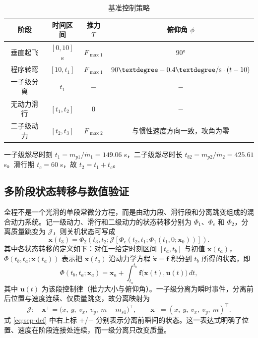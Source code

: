 \documentclass[withoutpreface,bwprint]{cumcmthesis}
\begin{document}
\begin{table}[!htbp]
\caption{基准控制策略}
\label{tab:q1ctrl}
\centering
\begin{tabular}{c|c|c|c}
\toprule[1.5pt]
阶段 & 时间区间 & 推力 $T$ & 俯仰角 $\phi$ \\
\midrule[1pt]
垂直起飞 & $[0,10]$ s & $F_{\max1}$ & $90°$ \\
程序转弯 & $[10,t_1]$ & $F_{\max1}$ & $90°-0.4°/{\rm s}\cdot(t-10)$ \\
一子级分离 & $t_1$ & $-$ & $-$ \\
无动力滑行 & $[t_1,t_2]$ & $0$ & $-$ \\
二子级动力 & $[t_2, t_3]$ & $F_{\max2}$ & 与惯性速度方向一致，攻角为零 \\
\bottomrule[1.5pt]
\end{tabular}
\end{table}

一子级燃尽时刻 $t_1=m_{p1}/\dot m_1=149.06$ s，二子级燃尽时长 $t_{b2}=m_{p2}/\dot m_2=425.61$ s。滑行期 $t_c=60$ s，故 $t_2=t_1+t_c$。

\subsection{多阶段状态转移与数值验证}
全程不是一个光滑的单段常微分方程，而是由动力段、滑行段和分离跳变组成的混合动力系统。记一级动力、滑行和二级动力的状态转移分别为 $\Phi_1$、$\Phi_c$ 和 $\Phi_2$，分离质量跳变为 $\mathcal J$，则关机状态可写成
\begin{equation}
\bm x(t_3)=\Phi_2\!\left(t_3,t_2;
\mathcal J\left[\Phi_c\!\left(t_2,t_1;
\Phi_1(t_1,0;\bm x_0)\right)\right]\right).
\label{eq:phase-map}
\end{equation}
其中各状态转移的定义如下：对任一给定时刻区间 $[t_a,t_b]$ 与初值 $\bm x(t_a)$，$\Phi(t_b,t_a;\bm x(t_a))$ 表示把 $\bm x(t_a)$ 沿动力学方程 $\dot{\bm x}=\bm f$ 积分到 $t_b$ 所得的状态，即
\begin{equation}
\Phi(t_b,t_a;\bm x_a)=\bm x_a+\int_{t_a}^{t_b}\bm f\big(\bm x(t),\bm u(t)\big)\,dt,
\label{eq:phi-def}
\end{equation}
其中 $\bm u(t)$ 为该段控制律（推力大小与俯仰角）。一子级分离为瞬时事件，分离前后位置与速度连续、仅质量跳变，故分离映射为
\begin{equation}
\mathcal J:\quad \bm x^+=\big(x,\ y,\ v_x,\ v_y,\ m-m_{s1}\big)^{\top},\qquad \bm x^-=(x,\ y,\ v_x,\ v_y,\ m)^{\top}.
\label{eq:sep-def}
\end{equation}
式 \eqref{eq:sep-def} 中右上标 $+$/$-$ 分别表示分离前瞬间的状态。这一表达式明确了位置、速度在阶段连接处连续，而一级分离只改变质量。
\end{document}
